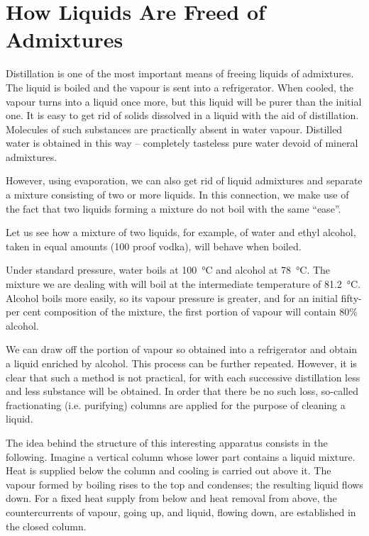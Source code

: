 \section{How Liquids Are Freed of Admixtures}

Distillation is one of the most important means of freeing liquids of admixtures. The liquid is boiled and the vapour is sent into a refrigerator. When cooled, the vapour turns into a liquid once more, but this liquid will be purer than the initial one.
It is easy to get rid of solids dissolved in a liquid with the aid of distillation. Molecules of such substances are practically absent in water vapour. Distilled water is obtained in this way -- completely tasteless pure water devoid of mineral admixtures.

However, using evaporation, we can also get rid of liquid admixtures and separate a mixture consisting of two or more liquids. In this connection, we make use of the fact that two liquids forming a mixture do not boil with the same ``ease''.

Let us see how a mixture of two liquids, for example, of water and ethyl alcohol, taken in equal amounts (100 proof vodka), will behave when boiled.

Under standard pressure, water boils at \SI{100}{\celsius} and al­cohol at \SI{78}{\celsius}. The mixture we are dealing with will boil at the intermediate temperature of \SI{81.2}{\celsius}. Alcohol boils more easily, so its vapour pressure is greater, and for an initial fifty-per cent composition of the mixture, the first portion of vapour will contain 80\% alcohol.

We can draw off the portion of vapour so obtained into a refrigerator and obtain a liquid enriched by alcohol. This process can be further repeated. However, it is clear that such a method is not practical, for with each suc­cessive distillation less and less substance will be obtained. In order that there be no such loss, so-called fraction­ating (i.e. purifying) columns are applied for the pur­pose of cleaning a liquid.

The idea behind the structure of this interesting appa­ratus consists in the following. Imagine a vertical column whose lower part contains a liquid mixture. Heat is supplied below the column and cooling is carried out above it. The vapour formed by boiling rises to the top and condenses; the resulting liquid flows down. For a fixed heat supply from below and heat removal from above, the countercurrents of vapour, going up, and liquid, flowing down, are established in the closed column.

